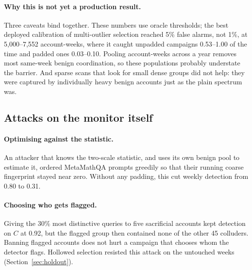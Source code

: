 \paragraph{Why this is not yet a production result.} Three caveats bind together. These numbers use oracle thresholds; the best deployed calibration of multi-outlier selection reached 5\% false alarms, not 1\%, at 5{,}000--7{,}552 account-weeks, where it caught unpadded campaigns 0.53--1.00 of the time and padded ones 0.03--0.10. Pooling account-weeks across a year removes most same-week benign coordination, so these populations probably understate the barrier. And sparse scans that look for small dense groups did not help: they were captured by individually heavy benign accounts just as the plain spectrum was.


\subsection{Attacks on the monitor itself}
\label{sec:attacks-full}

\paragraph{Optimising against the statistic.} An attacker that knows the two-scale statistic, and uses its own benign pool to estimate it, ordered MetaMathQA prompts greedily so that their running coarse fingerprint stayed near zero. Without any padding, this cut weekly detection from 0.80 to 0.31.

\paragraph{Choosing who gets flagged.} Giving the 30\% most distinctive queries to five sacrificial accounts kept detection on $C$ at 0.92, but the flagged group then contained none of the other 45 colluders. Banning flagged accounts does not hurt a campaign that chooses whom the detector flags. Hollowed selection resisted this attack on the untouched weeks (Section~\ref{sec:holdout}).

